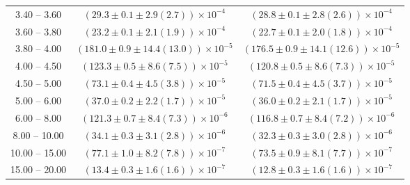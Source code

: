\begin{table}
\begin{center}
\begin{tabular}{ c | c c }
3.40 -- 3.60 & $(29.3\pm0.1\pm2.9(2.7))\times10^{-4}$ & $(28.8\pm0.1\pm2.8(2.6))\times10^{-4}$ \\ 
3.60 -- 3.80 & $(23.2\pm0.1\pm2.1(1.9))\times10^{-4}$ & $(22.7\pm0.1\pm2.0(1.8))\times10^{-4}$ \\ 
3.80 -- 4.00 & $(181.0\pm0.9\pm14.4(13.0))\times10^{-5}$ & $(176.5\pm0.9\pm14.1(12.6))\times10^{-5}$ \\ 
4.00 -- 4.50 & $(123.3\pm0.5\pm8.6(7.5))\times10^{-5}$ & $(120.8\pm0.5\pm8.6(7.3))\times10^{-5}$ \\ 
4.50 -- 5.00 & $(73.1\pm0.4\pm4.5(3.8))\times10^{-5}$ & $(71.5\pm0.4\pm4.5(3.7))\times10^{-5}$ \\ 
5.00 -- 6.00 & $(37.0\pm0.2\pm2.2(1.7))\times10^{-5}$ & $(36.0\pm0.2\pm2.1(1.7))\times10^{-5}$ \\ 
6.00 -- 8.00 & $(121.3\pm0.7\pm8.4(7.3))\times10^{-6}$ & $(116.8\pm0.7\pm8.4(7.2))\times10^{-6}$ \\ 
8.00 -- 10.00 & $(34.1\pm0.3\pm3.1(2.8))\times10^{-6}$ & $(32.3\pm0.3\pm3.0(2.8))\times10^{-6}$ \\ 
10.00 -- 15.00 & $(77.1\pm1.0\pm8.2(7.8))\times10^{-7}$ & $(73.5\pm0.9\pm8.1(7.7))\times10^{-7}$ \\ 
15.00 -- 20.00 & $(13.4\pm0.3\pm1.6(1.6))\times10^{-7}$ & $(12.8\pm0.3\pm1.6(1.6))\times10^{-7}$ \\ 
\hline
\end{tabular}
\end{center}
\end{table}
 
